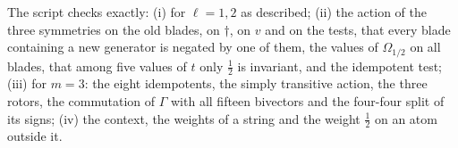 The script checks exactly: (i) for $\ell = 1, 2$ as described; (ii) the action of the three symmetries on the old blades, on $\dagger$, on $v$ and on the tests, that every blade containing a new generator is negated by one of them, the values of $\Omega_{1/2}$ on all blades, that among five values of $t$ only $\tfrac12$ is invariant, and the idempotent test; (iii) for $m = 3$: the eight idempotents, the simply transitive action, the three rotors, the commutation of $\Gamma$ with all fifteen bivectors and the four-four split of its signs; (iv) the context, the weights of a string and the weight $\tfrac12$ on an atom outside it.
